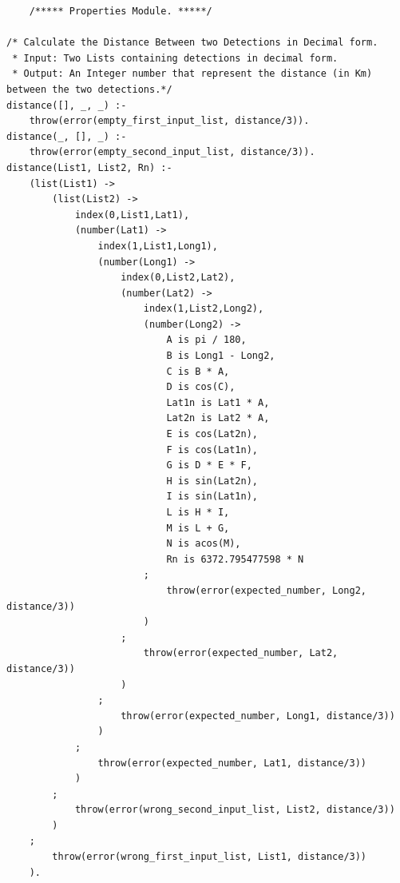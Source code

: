 \documentclass{article}
\begin{document}
\begin{lstlisting}
	/***** Properties Module. *****/

/* Calculate the Distance Between two Detections in Decimal form.
 * Input: Two Lists containing detections in decimal form.
 * Output: An Integer number that represent the distance (in Km) between the two detections.*/
distance([], _, _) :-
    throw(error(empty_first_input_list, distance/3)).
distance(_, [], _) :-
    throw(error(empty_second_input_list, distance/3)).
distance(List1, List2, Rn) :-
    (list(List1) -> 
        (list(List2) ->
            index(0,List1,Lat1),
            (number(Lat1) -> 
                index(1,List1,Long1),
                (number(Long1) -> 
                    index(0,List2,Lat2),
                    (number(Lat2) -> 
                        index(1,List2,Long2),
                        (number(Long2) -> 
                            A is pi / 180,
                            B is Long1 - Long2,
                            C is B * A,
                            D is cos(C),
                            Lat1n is Lat1 * A,
                            Lat2n is Lat2 * A,
                            E is cos(Lat2n),
                            F is cos(Lat1n),
                            G is D * E * F,
                            H is sin(Lat2n),
                            I is sin(Lat1n),
                            L is H * I,
                            M is L + G,
                            N is acos(M),
                            Rn is 6372.795477598 * N
                        ;
                            throw(error(expected_number, Long2, distance/3))
                        )
                    ;
                        throw(error(expected_number, Lat2, distance/3))
                    )
                ;
                    throw(error(expected_number, Long1, distance/3))
                )
            ;
                throw(error(expected_number, Lat1, distance/3))
            )
        ;
            throw(error(wrong_second_input_list, List2, distance/3))
        )
    ;
        throw(error(wrong_first_input_list, List1, distance/3))
    ).


\end{lstlisting}
\end{document}
